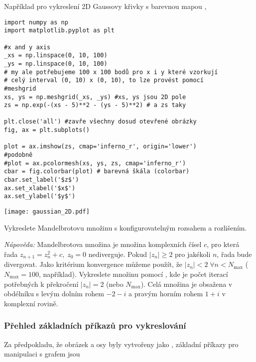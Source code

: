 Například pro vykreslení 2D Gaussovy křivky s barevnou mapou ,
\begin{lstlisting}[caption=Příklad dvourozměrného vykreslování.]
import numpy as np
import matplotlib.pyplot as plt

#x and y axis
_xs = np.linspace(0, 10, 100)
_ys = np.linspace(0, 10, 100)
# my ale potřebujeme 100 x 100 bodů pro x i y které vzorkují
# celý interval (0, 10) x (0, 10), to lze provést pomocí
#meshgrid
xs, ys = np.meshgrid(_xs, _ys) #xs, ys jsou 2D pole
zs = np.exp(-(xs - 5)**2 - (ys - 5)**2) # a zs taky

plt.close('all') #zavře všechny dosud otevřené obrázky
fig, ax = plt.subplots()

plot = ax.imshow(zs, cmap='inferno_r', origin='lower')
#podobně
#plot = ax.pcolormesh(xs, ys, zs, cmap='inferno_r') 
cbar = fig.colorbar(plot) # barevná škála (colorbar)
cbar.set_label('$z$')
ax.set_xlabel('$x$')
ax.set_ylabel('$y$')
\end{lstlisting}
\begin{center}
    \texttt{[image: gaussian\_2D.pdf]}
\end{center}
\begin{exercise}
    Vykreslete Mandelbrotovu množinu s konfigurovatelným rozsahem a rozlišením.

    \emph{Nápověda:} Mandelbrotova množina je množina komplexních čísel $c$, pro která řada $z_{n+1} = z_n^2 + c,\; z_0 = 0$ nediverguje. Pokud $|z_n| \geq 2$ pro jakékoli $n$, řada bude divergovat. Jako kritérium konvergence můžeme použít, že $|z_n| < 2\; \forall n < N_\mathrm{max}$ ($N_\mathrm{max} = 100$, například). Vykreslete množinu pomocí , kde  je počet iterací potřebných k překročení $|z_n| = 2$ (nebo $N_\mathrm{max}$). Celá množina je obsažena v obdélníku s levým dolním rohem $-2-i$ a pravým horním rohem $1+i$ v komplexní rovině.
\end{exercise}

\subsubsection{Přehled základních příkazů pro vykreslování}
Za předpokladu, že obrázek a osy byly vytvořeny jako , základní příkazy pro manipulaci s grafem jsou

